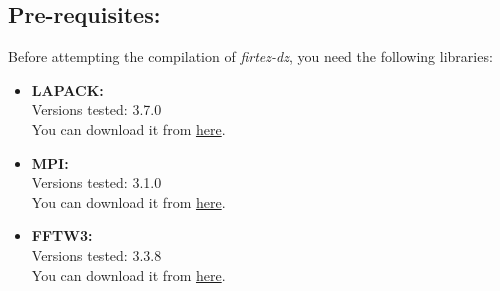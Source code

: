 %
\subsection{Pre-requisites:}
\label{ssec:prereq}
%
Before attempting the compilation of {\it firtez-dz}, you need the following libraries:
%
\begin{itemize}
  \item {\bf LAPACK:} \\
  Versions tested: 3.7.0\\
  You can download it from \href{http://www.netlib.org/lapack/}{here}.\\
  \item {\bf MPI:}\\
  Versions tested: 3.1.0\\
  You can download it from \href{https://www.open-mpi.org/}{here}.\\
  \item {\bf FFTW3:}\\
  Versions tested: 3.3.8\\
  You can download it from \href{http://www.fftw.org/}{here}.\\
\end{itemize}
%
